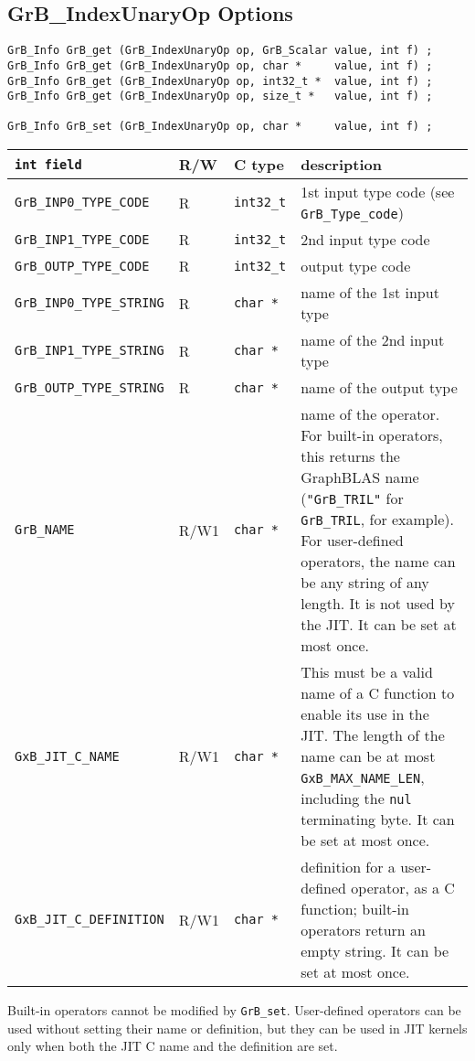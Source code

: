 \newpage
\subsection{{\sf GrB\_IndexUnaryOp} Options}
\label{get_set_idxunop}

\begin{mdframed}[userdefinedwidth=6in]
{\footnotesize
\begin{verbatim}
GrB_Info GrB_get (GrB_IndexUnaryOp op, GrB_Scalar value, int f) ;
GrB_Info GrB_get (GrB_IndexUnaryOp op, char *     value, int f) ;
GrB_Info GrB_get (GrB_IndexUnaryOp op, int32_t *  value, int f) ;
GrB_Info GrB_get (GrB_IndexUnaryOp op, size_t *   value, int f) ;

GrB_Info GrB_set (GrB_IndexUnaryOp op, char *     value, int f) ;
\end{verbatim}
}\end{mdframed}

\noindent
{\small
\begin{tabular}{|l|l|l|p{2.8in}|}
\hline
\verb'int field'                    & R/W  & C type        & description \\
\hline
\verb'GrB_INP0_TYPE_CODE'          & R    & \verb'int32_t'& 1st input type code (see \verb'GrB_Type_code') \\
\verb'GrB_INP1_TYPE_CODE'          & R    & \verb'int32_t'& 2nd input type code \\
\verb'GrB_OUTP_TYPE_CODE'          & R    & \verb'int32_t'& output type code \\
\verb'GrB_INP0_TYPE_STRING'        & R    & \verb'char *' & name of the 1st input type \\
\verb'GrB_INP1_TYPE_STRING'        & R    & \verb'char *' & name of the 2nd input type \\
\verb'GrB_OUTP_TYPE_STRING'        & R    & \verb'char *' & name of the output type \\
\hline
\verb'GrB_NAME'                     & R/W1 & \verb'char *' &    %
    name of the operator.  For built-in operators, this returns the GraphBLAS
    name (\verb'"GrB_TRIL"' for \verb'GrB_TRIL', for example).
    For user-defined operators, the name can be any string of any length.  It
    is not used by the JIT.  It can be set at most once. \\
\verb'GxB_JIT_C_NAME'               & R/W1 & \verb'char *' &
    This must be a valid name of a C function to enable its use in the JIT.
    The length of the name can be at most \verb'GxB_MAX_NAME_LEN', including
    the \verb'nul' terminating byte.  It can be set at most once. \\
\verb'GxB_JIT_C_DEFINITION'         & R/W1 & \verb'char *' &
    definition for a user-defined operator, as a C function; built-in operators
    return an empty string.  It can be set at most once. \\
\hline
\end{tabular}
}

Built-in operators cannot be modified by \verb'GrB_set'.  User-defined
operators can be used without setting their name or definition, but they can be
used in JIT kernels only when both the JIT C name and the definition are set.

